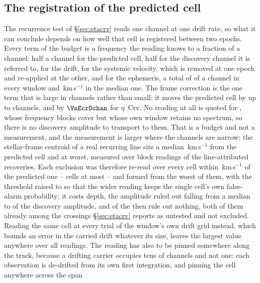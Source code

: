 \subsection{The registration of the predicted cell}
\label{sec:regbudget}

The recurrence test of \S\ref{sec:etacrv} reads one channel at one drift
rate, so what it can conclude depends on how well that cell is registered
between two epochs. Every term of the budget is a frequency the reading
knows to a fraction of a channel: half a channel for the predicted cell,
half for the discovery channel it is referred to, \RgDriftWithinChMed{}
for the drift, \RgVsysChMax{} for the systemic velocity, which is removed at
one epoch and re-applied at the other, and \RgBaryChMax{} for the ephemeris,
a total of \RgBudgetChMed{} of a channel in every window and
\RgBudgetKmsMed\,km\,s$^{-1}$ in the median one. The frame correction is the
one term that is large in channels rather than small: it moves the predicted
cell by up to \ZtFrameChanMax{} channels, and by $\VnEcrDchan$ for
$\eta$~Crv. No reading at all is quoted for \RcUntStar{} \texttt{\RcUntEb},
whose frequency \RcUntNRep{} blocks cover but whose own window retains no
spectrum, so there is no discovery amplitude to transport to them. That is a
budget and not a
measurement, and the measurement is larger where the channels are narrow: the
stellar-frame centroid of a real recurring line sits a median
\RgCenMedKms\,km\,s$^{-1}$ from the predicted cell and \RgCenMaxKms{} at
worst, measured over \RgCenNBlock{} block readings of the line-attributed
recoveries. Each exclusion was therefore re-read over every cell within
\RgTolKms\,km\,s$^{-1}$ of the predicted one -- \RgNTrialMax{} cells at most
-- and formed from the worst of them, with the threshold raised to
\RgThrMax{} so that the wider reading keeps the single cell's own false-alarm
probability; it costs depth, the amplitude ruled out falling from a median
\RcFracMed{} to \RgFracMed{} of the discovery amplitude, and \RgNVac{} of the
\RcNExcl{} then rule out nothing, both of them already among the
\HjNPowerLo{} crossings \S\ref{sec:etacrv} reports as untested and not
excluded. Reading the same cell at every trial of the window's own drift grid
instead, which bounds an error in the carried drift whatever its size, leaves
the largest value anywhere \RcTMax{} over all \RcNRepeatMeas{} readings. The
reading has also to be pinned somewhere along the track, because a drifting
carrier occupies tens of channels and not one: each observation is de-drifted
from its own first integration, and pinning the cell anywhere across the span
